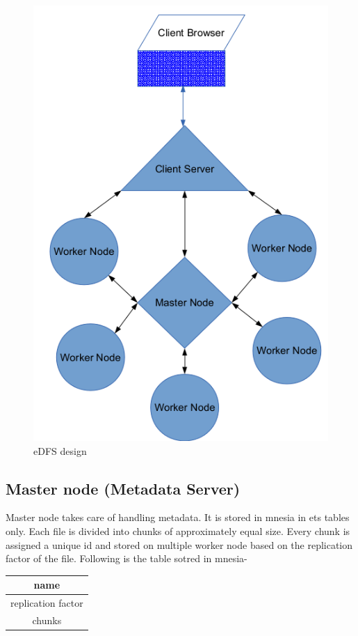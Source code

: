 \documentclass[a4paper,12pt]{article}
\begin{document}
\begin{figure}[h]
  \begin{center}
    \includegraphics[scale = 0.5]{images/design}
  \end{center}
  \caption{eDFS design}
  \label{edfs_design}
\end{figure}

\subsection{Master node (Metadata Server)}
Master node takes care of handling metadata. It is stored in mnesia in ets tables only. Each file is divided into chunks of approximately equal size. Every chunk is assigned a unique id and stored on multiple worker node based on the replication factor of the file. Following is the table sotred in mnesia-
\begin{table}[h]
\centering
\begin{tabular}{|c|}
\hline 
name \\ 
\hline 
replication factor \\ 
\hline 
chunks \\ 
\hline 
\end{tabular} 
\end{table}
\end{document}
